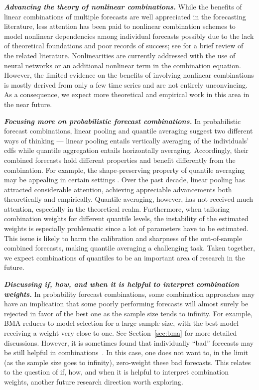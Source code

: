 \documentclass[a4paper,11pt]{article}
\begin{document}
\textbf{\textit{Advancing the theory of nonlinear combinations.}} While the benefits of linear combinations of multiple forecasts are well appreciated in the forecasting literature, less attention has been paid to nonlinear combination schemes to model nonlinear dependencies among individual forecasts possibly due to the lack of theoretical foundations and poor records of success; see \citet{Timmermann2006-en} for a brief review of the related literature. Nonlinearities are currently addressed with the use of neural networks or an additional nonlinear term in the combination equation. However, the limited evidence on the benefits of involving nonlinear combinations is mostly derived from only a few time series and are not entirely unconvincing. As a consequence, we expect more theoretical and empirical work in this area in the near future.

\textbf{\textit{Focusing more on probabilistic forecast combinations.}} In probabilistic forecast combinations, linear pooling and quantile averaging suggest two different ways of thinking --- linear pooling entails vertically averaging of the individuals' cdfs while quantile aggregation entails horizontally averaging. Accordingly, their combined forecasts hold different properties and benefit differently from the combination. For example, the shape-preserving property of quantile averaging may be appealing in certain settings \citep{Lichtendahl2013-rt}. Over the past decade, linear pooling has attracted considerable attention, achieving appreciable advancements both theoretically and empirically. Quantile averaging, however, has not received much attention, especially in the theoretical realm. Furthermore, when tailoring combination weights for different quantile levels, the instability of the estimated weights is especially problematic since a lot of parameters have to be estimated. This issue is likely to harm the calibration and sharpness of the out-of-sample combined forecasts, making quantile averaging a challenging task. Taken together, we expect combinations of quantiles to be an important area of research in the future.

\textbf{\textit{Discussing if, how, and when it is helpful to interpret combination weights.}} In probability forecast combinations, some combination approaches may have an implication that some poorly performing forecasts will almost surely be rejected in favor of the best one as the sample size tends to infinity. For example, BMA reduces to model selection for a large sample size, with the best model receiving a weight very close to one. See Section~\ref{sec:bma} for more detailed discussions. However, it is sometimes found that individually ``bad'' forecasts may be still helpful in combinations~\citep[e.g.,][]{Geweke2011-xk}. In this case, one does not want to, in the limit (as the sample size goes to infinity), zero-weight these bad forecasts. This relates to the question of if, how, and when it is helpful to interpret combination weights, another future research direction worth exploring.
\end{document}
